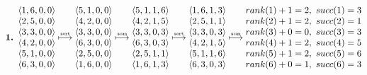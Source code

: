 \begin{align*}
  \text{\bf 1. }
  \begin{matrix}
    \langle 1, 6, 0, 0 \rangle \\
    \langle 2, 5, 0, 0 \rangle \\
    \langle 3, 3, 0, 0 \rangle \\
    \langle 4, 2, 0, 0 \rangle \\
    \langle 5, 1, 0, 0 \rangle \\
    \langle 6, 3, 0, 0 \rangle \\
  \end{matrix}
  \stackrel{\text{\tiny \tt sort}}{\longmapsto}
  \begin{matrix}
    \langle 5, 1, 0, 0 \rangle \\
    \langle 4, 2, 0, 0 \rangle \\
    \langle 3, 3, 0, 0 \rangle \\
    \langle 6, 3, 0, 0 \rangle \\
    \langle 2, 5, 0, 0 \rangle \\
    \langle 1, 6, 0, 0 \rangle \\
  \end{matrix}
  \stackrel{\text{\tiny \tt scan}}{\longmapsto}
  \begin{matrix}
    \langle 5, 1, 1, 6 \rangle \\
    \langle 4, 2, 1, 5 \rangle \\
    \langle 3, 3, 0, 3 \rangle \\
    \langle 6, 3, 0, 3 \rangle \\
    \langle 2, 5, 1, 1 \rangle \\
    \langle 1, 6, 1, 3 \rangle \\
  \end{matrix}
  \stackrel{\text{\tiny \tt sort}}{\longmapsto}
  \begin{matrix}
    \langle 1, 6, 1, 3 \rangle \\
    \langle 2, 5, 1, 1 \rangle \\
    \langle 3, 3, 0, 3 \rangle \\
    \langle 4, 2, 1, 5 \rangle \\
    \langle 5, 1, 1, 6 \rangle \\
    \langle 6, 3, 0, 3 \rangle \\
  \end{matrix}
  \stackrel{\text{\tiny \tt scan}}{\longmapsto}
  \begin{matrix}
    rank(1) + 1 = 2,\ succ(1) = 3 \\
    rank(2) + 1 = 2,\ succ(2) = 1 \\
    rank(3) + 0 = 0,\ succ(3) = 3 \\
    rank(4) + 1 = 2,\ succ(4) = 5 \\
    rank(5) + 1 = 2,\ succ(5) = 6 \\
    rank(6) + 0 = 1,\ succ(6) = 3 \\
  \end{matrix}
\end{align*}
